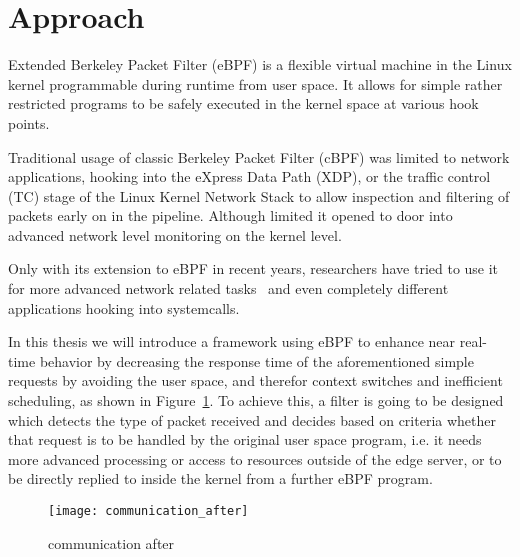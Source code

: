 \section{Approach}


Extended Berkeley Packet Filter (eBPF) is a flexible virtual machine in the
Linux kernel programmable during runtime from user space. It allows for simple
rather restricted programs to be safely executed in the kernel space at various
hook points.


Traditional usage of classic Berkeley Packet Filter (cBPF) was limited to
network applications, hooking into the eXpress Data Path (XDP), or the traffic
control (TC) stage of the Linux Kernel Network Stack to allow inspection and
filtering of packets early on in the pipeline. Although limited it opened to
door into advanced network level monitoring on the kernel level.

Only with its extension to eBPF in recent years, researchers have tried to use
it for more advanced network related tasks~\cite{miano_creating_2018} and even
completely different applications hooking into systemcalls.


In this thesis we will introduce a framework using eBPF to enhance near
real-time behavior by decreasing the response time of the aforementioned simple
requests by avoiding the user space, and therefor context switches and
inefficient scheduling, as shown in Figure~\ref{fig:communication_after}. To
achieve this, a filter is going to be designed which detects the type of packet
received and decides based on criteria whether that request is to be handled by
the original user space program, i.e. it needs more advanced processing or
access to resources outside of the edge server, or to be directly replied to
inside the kernel from a further eBPF program.


\begin{figure}[htpb]
       \centering
       \texttt{[image: communication\_after]}
       \caption{communication after%
       \label{fig:communication_after}}%
\end{figure}
